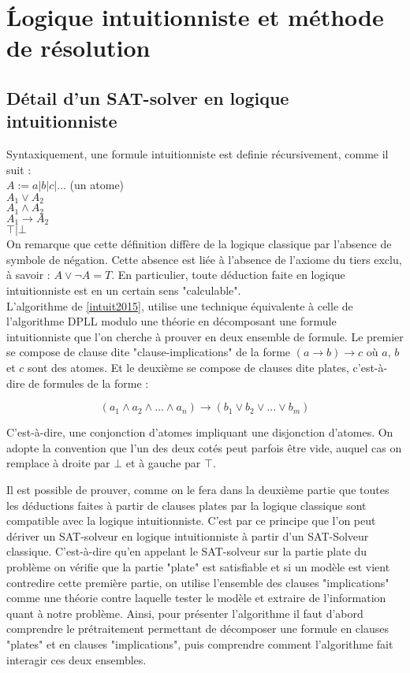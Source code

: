 \section{\'Logique intuitionniste et m\'ethode de r\'esolution}

\subsection{D\'etail d'un SAT-solver en logique intuitionniste}
Syntaxiquement, une formule intuitionniste est definie récursivement, comme il suit : \\

$A := a | b |c |... $ (un atome) \\
$A_1 \lor A_2 $ \\
$A_1 \land A_2 $ \\
$A_1 \to A_2 $ \\
$\top | \bot$ \\


On remarque que cette d\'efinition diff\`ere de la logique classique par l'absence de symbole de n\'egation. Cette absence est li\'ee \`a l'absence de l'axiome du tiers exclu, \`a savoir : $A \lor \neg A = T$. En particulier, toute d\'eduction faite en logique intuitionniste est en un certain sens "calculable".
\\
L'algorithme de \ref{intuit2015}, utilise une technique \'equivalente à celle de l'algorithme DPLL modulo une théorie en d\'ecomposant une formule intuitionniste que l'on cherche \`a prouver en deux ensemble de formule. Le premier se compose de clause dite "clause-implications" de la forme $(a \to b) \to c$ o\`u $a$, $b$et $c$ sont des atomes. Et le deuxi\`eme se compose de clauses dite plates, c'est-\`a-dire de formules de la forme :

$$(a_1 \land a_2 \land ... \land a_n) \to (b_1 \lor b_2 \lor ... \lor b_m) $$

C'est-\`a-dire, une conjonction d'atomes impliquant une disjonction d'atomes. On adopte la convention que l'un des deux cot\'es peut parfois \^etre vide, auquel cas on remplace \`a droite par $\bot$ et \`a gauche par $\top$. 


Il est possible de prouver, comme on le fera dans la deuxi\`eme partie que toutes les déductions faites \`a partir de clauses plates par la logique classique sont compatible avec la logique intuitionniste. C'est par ce principe que l'on peut d\'eriver un SAT-solveur en logique intuitionniste \`a partir d'un SAT-Solveur classique. C'est-\`a-dire qu'en appelant le SAT-solveur sur la partie plate du probl\`eme on v\'erifie que la partie "plate" est satisfiable et si un mod\`ele est vient contredire cette premi\`ere partie, on utilise l'ensemble des clauses "implications" comme une th\'eorie contre laquelle tester le mod\`ele et extraire de l'information quant \`a notre probl\`eme.
Ainsi, pour pr\'esenter l'algorithme il faut d'abord comprendre le pr\'etraitement permettant de d\'ecomposer une formule en clauses "plates" et en clauses "implications", puis comprendre comment l'algorithme fait interagir ces deux ensembles.



